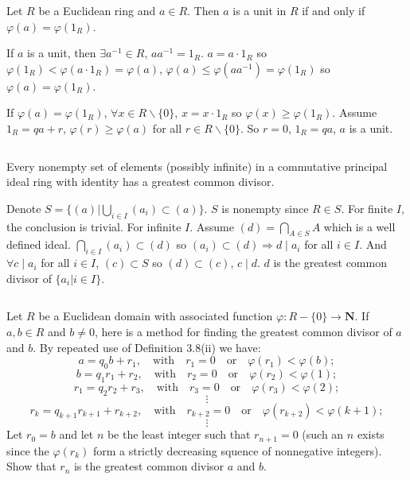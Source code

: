 $$ $$

\begin{ex}
    Let $R$ be a Euclidean ring and $a\in R$. Then $a$ is a unit in $R$ if and only if $\varphi(a)=\varphi(1_{R})$.
\end{ex}

\begin{answer}
    If $a$ is a unit, then $\exists a^{-1}\in R$, $aa^{-1}=1_{R}$. $a=a\cdot 1_{R}$ so $\varphi(1_{R})<\varphi(a\cdot 1_{R})=\varphi(a)$, $\varphi(a)\leq \varphi(aa^{-1})=\varphi(1_{R})$ so $\varphi(a)=\varphi(1_{R})$.

    If $\varphi(a)=\varphi(1_{R})$, $\forall x\in R\backslash \{0\}$, $x=x\cdot 1_{R}$ so $\varphi(x)\geq \varphi(1_{R})$. Assume $1_{R}=qa+r$, $\varphi(r)\geq \varphi(a)$ for all $r\in R\backslash\{0\}$. So $r=0$, $1_{R}=qa$, $a$ is a unit.
\end{answer}

$$ $$

\begin{ex}
    Every nonempty set of elements (possibly infinite) in a commutative principal ideal ring with identity has a greatest common divisor.
\end{ex}

\begin{answer}
    Denote $S=\{(a)|\bigcup\limits_{i\in I}(a_{i})\subset (a)\}$. $S$ is nonempty since $R\in S$. For finite $I$, the conclusion is trivial. For infinite $I$. Assume $(d)= \bigcap\limits_{A\in S}A$ which is a well defined ideal. $\bigcap\limits_{i\in I}(a_{i})\subset(d)$ so $(a_{i})\subset (d)\Rightarrow d\mid a_{i}$ for all $i\in I$. And $\forall c\mid a_{i}$ for all $i\in I$, $(c)\subset S$ so $(d)\subset (c)$, $c\mid d$. $d$ is the greatest common divisor of $\{a_{i}|i\in I\}$.
\end{answer}

$$ $$

\begin{ex}
    Let $R$ be a Euclidean domain with associated function $\varphi :R-\{0\}\to \mathbf{N}$. If $a,b\in R$ and $b\neq 0$, here is a method for finding the greatest common divisor of $a$ and $b$. By repeated use of Definition 3.8(ii) we have:
    \[a=q_{0}b+r_{1},\quad\text{with}\quad r_{1}=0\quad\text{or}\quad\varphi(r_{1})<\varphi(b);\]
    \[b=q_{1}r_{1}+r_{2},\quad\text{with}\quad r_{2}=0\quad\text{or}\quad\varphi(r_{2})<\varphi(1);\]
    \[r_{1}=q_{2}r_{2}+r_{3},\quad\text{with}\quad r_{3}=0\quad\text{or}\quad\varphi(r_{3})<\varphi(2);\]
    \[\vdots\]
    \[r_{k}=q_{k+1}r_{k+1}+r_{k+2},\quad\text{with}\quad r_{k+2}=0\quad\text{or}\quad\varphi(r_{k+2})<\varphi(k+1);\]
    \[\vdots\]
    Let $r_{0}=b$ and let $n$ be the least integer such that $r_{n+1}=0$ (such an $n$ exists since the $\varphi(r_{k})$ form a strictly decreasing squence of nonnegative integers). Show that $r_{n}$ is the greatest common divisor $a$ and $b$.
\end{ex}

